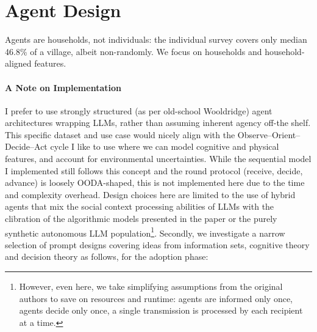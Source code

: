 \documentclass[11pt]{article}
\begin{document}
\section{Agent Design}

Agents are households, not individuals: the individual survey covers only median 46.8\% of a village, albeit non-randomly. We focus on households and household-aligned features.

\paragraph{A Note on Implementation}
I prefer to use strongly structured (as per old-school Wooldridge) agent architectures wrapping LLMs, rather than assuming inherent agency off-the shelf.
This specific dataset and use case would nicely align with the Observe--Orient--Decide--Act cycle I like to use where we can model cognitive and physical features, and account for environmental uncertainties.
While the sequential model I implemented still follows this concept and the round protocol (receive, decide, advance) is loosely OODA-shaped, this is not implemented here due to the time and complexity overhead.
Design choices here are limited to the use of hybrid agents that mix the social context processing abilities of LLMs with the clibration of the algorithmic models presented in the paper or the purely synthetic autonomous LLM population\footnote{However, even here, we take simplifying assumptions from the original authors to save on resources and runtime: agents are informed only once, agents decide only once, a single transmission is processed by each recipient at a time.}. Secondly, we investigate a narrow selection of prompt designs covering ideas from information sets, cognitive theory and decision theory as follows, for the adoption phase:
\end{document}
